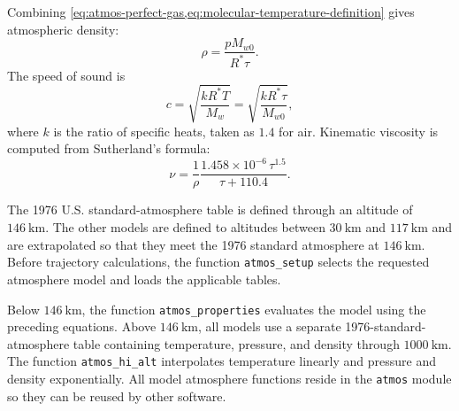 
Combining \cref{eq:atmos-perfect-gas,eq:molecular-temperature-definition} gives
atmospheric density:
\begin{equation}
  \rho=\frac{pM_{w0}}{R^*\tau}.
  \label{eq:atmos-density}
\end{equation}
The speed of sound is
\begin{equation}
  c=\sqrt{\frac{kR^*T}{M_w}}
   =\sqrt{\frac{kR^*\tau}{M_{w0}}},
  \label{eq:atmos-speed-of-sound}
\end{equation}
where $k$ is the ratio of specific heats, taken as $1.4$ for air. Kinematic
viscosity is computed from Sutherland's formula:
\begin{equation}
  \nu
  =\frac{1}{\rho}
   \frac{1.458\times10^{-6}\,\tau^{1.5}}{\tau+110.4}.
  \label{eq:atmos-kinematic-viscosity}
\end{equation}


The 1976 U.S. standard-atmosphere table is defined through an altitude of
$146\ \mathrm{km}$. The other models are defined to altitudes between
$30\ \mathrm{km}$ and $117\ \mathrm{km}$ and are extrapolated so that they meet
the 1976 standard atmosphere at $146\ \mathrm{km}$. Before trajectory
calculations, the function \texttt{atmos\_setup} selects the requested atmosphere
model and loads the applicable tables.

Below $146\ \mathrm{km}$, the function \texttt{atmos\_properties} evaluates the
model using the preceding equations. Above $146\ \mathrm{km}$, all models use a
separate 1976-standard-atmosphere table containing temperature, pressure, and
density through $1000\ \mathrm{km}$. The function \texttt{atmos\_hi\_alt}
interpolates temperature linearly and pressure and density exponentially. All model
atmosphere functions reside in the \texttt{atmos} module so they can be reused by
other software.
